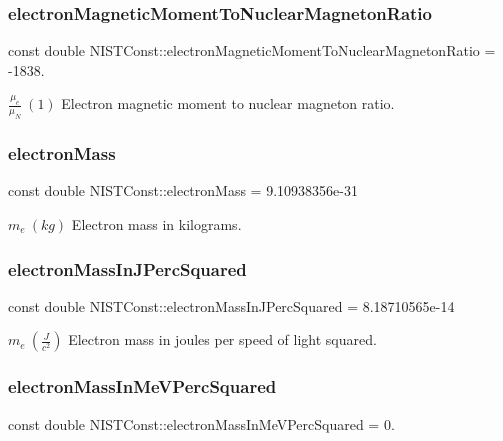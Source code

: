 \subsubsection{\texorpdfstring{electron\+Magnetic\+Moment\+To\+Nuclear\+Magneton\+Ratio}{electronMagneticMomentToNuclearMagnetonRatio}}
{\footnotesize\ttfamily const double N\+I\+S\+T\+Const\+::electron\+Magnetic\+Moment\+To\+Nuclear\+Magneton\+Ratio = -\/1838.}

$\frac{\mu_e}{\mu_N} \ (1)$ Electron magnetic moment to nuclear magneton ratio. \mbox{\label{group___electron_ga2c9773ce81cfbe85e9042adccd788589}} 
\subsubsection{\texorpdfstring{electron\+Mass}{electronMass}}
{\footnotesize\ttfamily const double N\+I\+S\+T\+Const\+::electron\+Mass = 9.\+10938356e-\/31}

$m_e \ (kg)$ Electron mass in kilograms. \mbox{\label{group___electron_gad128828903af19e91fdc1a95ef9cbb24}} 
\subsubsection{\texorpdfstring{electron\+Mass\+In\+J\+Perc\+Squared}{electronMassInJPercSquared}}
{\footnotesize\ttfamily const double N\+I\+S\+T\+Const\+::electron\+Mass\+In\+J\+Perc\+Squared = 8.\+18710565e-\/14}

$m_e \ (\frac{J}{c^2})$ Electron mass in joules per speed of light squared. \mbox{\label{group___electron_ga6a41b7cbd78c00ef17e9b17944ab5f5c}} 
\subsubsection{\texorpdfstring{electron\+Mass\+In\+Me\+V\+Perc\+Squared}{electronMassInMeVPercSquared}}
{\footnotesize\ttfamily const double N\+I\+S\+T\+Const\+::electron\+Mass\+In\+Me\+V\+Perc\+Squared = 0.}

